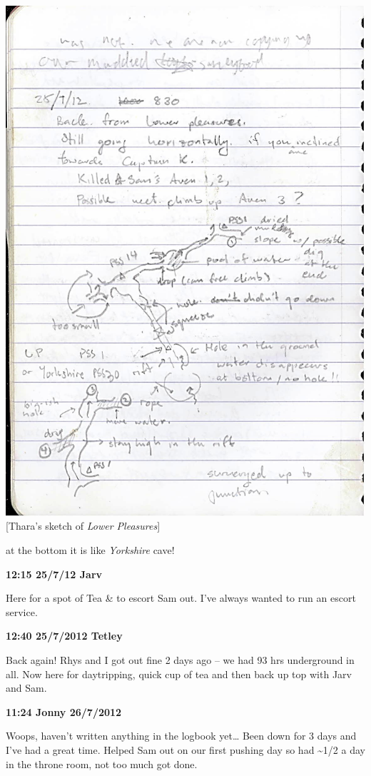 \includegraphics{UgLog1012/74.jpeg}\\
{[}Thara's sketch of \emph{Lower Pleasures}{]}

at the bottom it is like \emph{Yorkshire} cave!

\textbf{12:15 25/7/12 Jarv}

Here for a spot of Tea \& to escort Sam out. I've always wanted to run
an escort service.

\textbf{12:40 25/7/2012 Tetley}

Back again! Rhys and I got out fine 2 days ago -- we had 93 hrs
underground in all. Now here for daytripping, quick cup of tea and then
back up top with Jarv and Sam.

\textbf{11:24 Jonny 26/7/2012}

Woops, haven't written anything in the logbook yet\ldots{} Been down for
3 days and I've had a great time. Helped Sam out on our first pushing
day so had \textasciitilde 1/2 a day in the throne room, not too much
got done.

